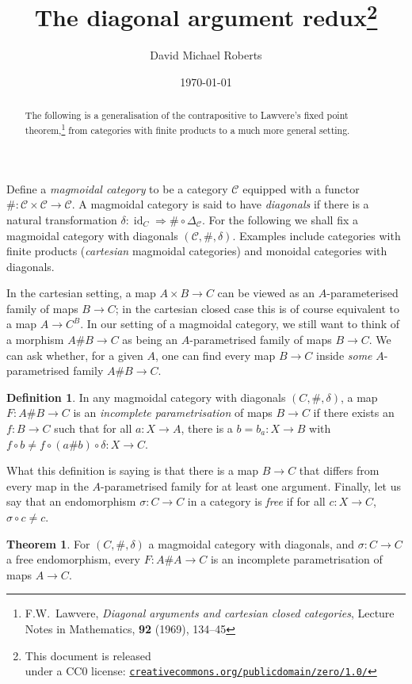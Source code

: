 \documentclass{tufte-handout}
\title{The diagonal argument redux\thanks{This document is released \\ under a CC0 license: \href{http://creativecommons.org/publicdomain/zero/1.0/}{\texttt{creativecommons.org/publicdomain/zero/1.0/}}}}
\author{David Michael Roberts}
\date{\today}
\theoremstyle{definition}
\newtheorem*{definition}{Definition}
\newtheorem*{theorem}{Theorem}
\DeclareMathOperator{\id}{id}
\def\CC{\mathcal{C}}
\begin{document}
\maketitle

\begin{abstract}
The following is a generalisation of the contrapositive to Lawvere's fixed point theorem,\footnote{F.W.~Lawvere, \emph{Diagonal arguments and cartesian closed categories}, Lecture Notes in Mathematics, \textbf{92} (1969), 134--45} from categories with finite products to a much more general setting.\end{abstract}

Define a \emph{magmoidal category} to be a category $\CC$ equipped with a functor $\# \colon \CC\times \CC\to \CC$.
A magmoidal category is said to have \emph{diagonals} if there is a natural transformation $\delta\colon \id_C \Rightarrow \#\circ \Delta_\CC$. 
For the following we shall fix a magmoidal category with diagonals $(\CC,\#,\delta)$.
Examples include categories with finite products (\emph{cartesian} magmoidal categories) and monoidal categories with diagonals.




In the cartesian setting, a map $A\times B \to C$ can be viewed as an $A$-parameterised family of maps $B\to C$; in the cartesian closed case this is of course equivalent to a map $A \to C^B$.
In our setting of a magmoidal category, we still want to think of a morphism $A\# B \to C$ as being an $A$-parametrised family of maps $B\to C$.
We can ask whether, for a given $A$, one can find every map $B\to C$ inside \emph{some} $A$-parametrised family $A\# B \to C$.

\begin{definition}
In any magmoidal category with diagonals $(C,\#,\delta)$, a map $F\colon A\#B\to C$ is an \emph{incomplete parametrisation} of maps $B\to C$ if there exists an $f\colon B\to C$ such that for all $a\colon X\to A$, there is a $b = b_a\colon X\to B$ with $f\circ b \not= f\circ(a\# b)\circ \delta\colon X\to C$.
\end{definition}

\noindent
What this definition is saying is that there is a map $B\to C$ that differs from every map in the $A$-parametrised family for at least one argument.
Finally, let us say that an endomorphism $\sigma\colon C\to C$ in a category is \emph{free} if for all $c\colon X\to C$, $\sigma\circ c \not=c$.

\begin{theorem}
  For $(C,\#,\delta)$ a magmoidal category with diagonals, and $\sigma \colon C\to C$ a free endomorphism, every $F\colon A\# A \to C$ is an incomplete parametrisation of maps $A\to C$.
\end{theorem}
\end{document}
